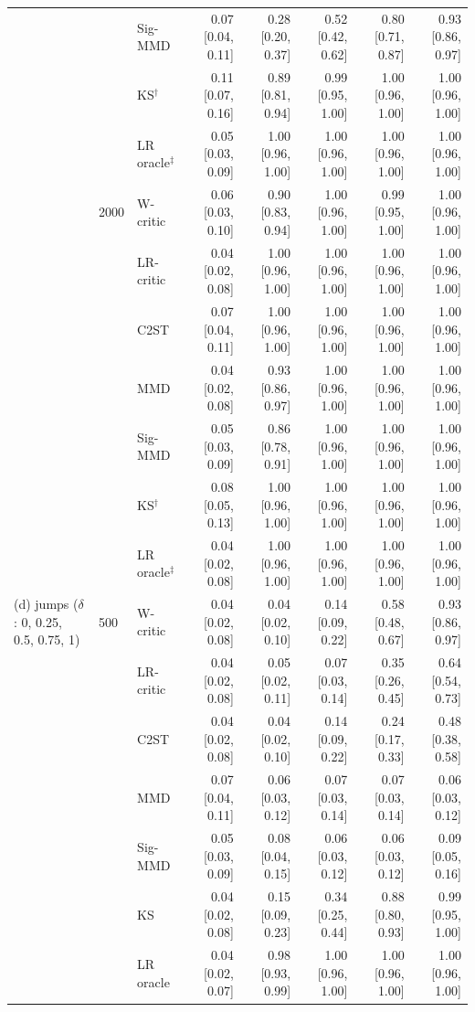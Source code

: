 \begin{tabular}{lllrrrrr}
 &  & Sig-MMD & 0.07 [0.04, 0.11] & 0.28 [0.20, 0.37] & 0.52 [0.42, 0.62] & 0.80 [0.71, 0.87] & 0.93 [0.86, 0.97] \\
 &  & KS$^{\dagger}$ & 0.11 [0.07, 0.16] & 0.89 [0.81, 0.94] & 0.99 [0.95, 1.00] & 1.00 [0.96, 1.00] & 1.00 [0.96, 1.00] \\
 &  & LR oracle$^{\ddagger}$ & 0.05 [0.03, 0.09] & 1.00 [0.96, 1.00] & 1.00 [0.96, 1.00] & 1.00 [0.96, 1.00] & 1.00 [0.96, 1.00] \\
 & 2000 & W-critic & 0.06 [0.03, 0.10] & 0.90 [0.83, 0.94] & 1.00 [0.96, 1.00] & 0.99 [0.95, 1.00] & 1.00 [0.96, 1.00] \\
 &  & LR-critic & 0.04 [0.02, 0.08] & 1.00 [0.96, 1.00] & 1.00 [0.96, 1.00] & 1.00 [0.96, 1.00] & 1.00 [0.96, 1.00] \\
 &  & C2ST & 0.07 [0.04, 0.11] & 1.00 [0.96, 1.00] & 1.00 [0.96, 1.00] & 1.00 [0.96, 1.00] & 1.00 [0.96, 1.00] \\
 &  & MMD & 0.04 [0.02, 0.08] & 0.93 [0.86, 0.97] & 1.00 [0.96, 1.00] & 1.00 [0.96, 1.00] & 1.00 [0.96, 1.00] \\
 &  & Sig-MMD & 0.05 [0.03, 0.09] & 0.86 [0.78, 0.91] & 1.00 [0.96, 1.00] & 1.00 [0.96, 1.00] & 1.00 [0.96, 1.00] \\
 &  & KS$^{\dagger}$ & 0.08 [0.05, 0.13] & 1.00 [0.96, 1.00] & 1.00 [0.96, 1.00] & 1.00 [0.96, 1.00] & 1.00 [0.96, 1.00] \\
 &  & LR oracle$^{\ddagger}$ & 0.04 [0.02, 0.08] & 1.00 [0.96, 1.00] & 1.00 [0.96, 1.00] & 1.00 [0.96, 1.00] & 1.00 [0.96, 1.00] \\
(d) jumps ($\delta$: 0, 0.25, 0.5, 0.75, 1) & 500 & W-critic & 0.04 [0.02, 0.08] & 0.04 [0.02, 0.10] & 0.14 [0.09, 0.22] & 0.58 [0.48, 0.67] & 0.93 [0.86, 0.97] \\
 &  & LR-critic & 0.04 [0.02, 0.08] & 0.05 [0.02, 0.11] & 0.07 [0.03, 0.14] & 0.35 [0.26, 0.45] & 0.64 [0.54, 0.73] \\
 &  & C2ST & 0.04 [0.02, 0.08] & 0.04 [0.02, 0.10] & 0.14 [0.09, 0.22] & 0.24 [0.17, 0.33] & 0.48 [0.38, 0.58] \\
 &  & MMD & 0.07 [0.04, 0.11] & 0.06 [0.03, 0.12] & 0.07 [0.03, 0.14] & 0.07 [0.03, 0.14] & 0.06 [0.03, 0.12] \\
 &  & Sig-MMD & 0.05 [0.03, 0.09] & 0.08 [0.04, 0.15] & 0.06 [0.03, 0.12] & 0.06 [0.03, 0.12] & 0.09 [0.05, 0.16] \\
 &  & KS & 0.04 [0.02, 0.08] & 0.15 [0.09, 0.23] & 0.34 [0.25, 0.44] & 0.88 [0.80, 0.93] & 0.99 [0.95, 1.00] \\
 &  & LR oracle & 0.04 [0.02, 0.07] & 0.98 [0.93, 0.99] & 1.00 [0.96, 1.00] & 1.00 [0.96, 1.00] & 1.00 [0.96, 1.00] \\

\end{tabular}
